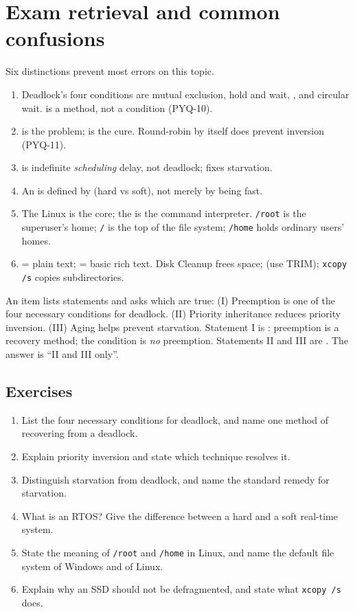 \section{Exam retrieval and common confusions}
Six distinctions prevent most errors on this topic.
\begin{enumerate}
  \item Deadlock's four conditions are mutual exclusion, hold and wait,
    , and circular wait.  is a
     method, not a condition (PYQ-10).
  \item {} is the problem;  is
    the cure. Round-robin by itself does  prevent inversion (PYQ-11).
  \item {} is indefinite \emph{scheduling} delay, not deadlock;
     fixes starvation.
  \item An  is defined by  (hard vs soft), not
    merely by being fast.
  \item The Linux  is the core; the  is the command
    interpreter. \texttt{/root} is the superuser's home; \texttt{/} is the top
    of the file system; \texttt{/home} holds ordinary users' homes.
  \item {} = plain text;  = basic rich text. Disk
    Cleanup frees space;  (use TRIM);
    \texttt{xcopy /s} copies subdirectories.
\end{enumerate}

\begin{example}
An item lists statements and asks which are true:
(I) Preemption is one of the four necessary conditions for deadlock.
(II) Priority inheritance reduces priority inversion.
(III) Aging helps prevent starvation.
Statement I is : preemption is a recovery method; the condition is
\emph{no} preemption. Statements II and III are . The answer is
``II and III only''.
\end{example}

\subsection*{Exercises}
\begin{enumerate}[label=\arabic*.]
  \item List the four necessary conditions for deadlock, and name one method
    of recovering from a deadlock.
  \item Explain priority inversion and state which technique resolves it.
  \item Distinguish starvation from deadlock, and name the standard remedy for
    starvation.
  \item What is an RTOS? Give the difference between a hard and a soft
    real-time system.
  \item State the meaning of \texttt{/root} and \texttt{/home} in Linux, and
    name the default file system of Windows and of Linux.
  \item Explain why an SSD should not be defragmented, and state what
    \texttt{xcopy /s} does.
\end{enumerate}

